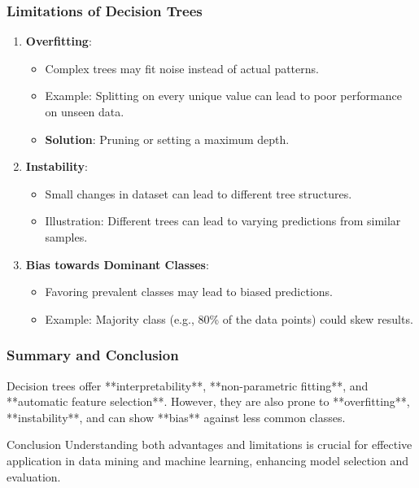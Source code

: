 \documentclass[aspectratio=169]{beamer}
\begin{document}
\begin{frame}[fragile]
    \frametitle{Limitations of Decision Trees}
    \begin{enumerate}
        \item \textbf{Overfitting}:
            \begin{itemize}
                \item Complex trees may fit noise instead of actual patterns.
                \item Example: Splitting on every unique value can lead to poor performance on unseen data.
                \item \textbf{Solution}: Pruning or setting a maximum depth.
            \end{itemize}
        
        \item \textbf{Instability}:
            \begin{itemize}
                \item Small changes in dataset can lead to different tree structures.
                \item Illustration: Different trees can lead to varying predictions from similar samples.
            \end{itemize}
        
        \item \textbf{Bias towards Dominant Classes}:
            \begin{itemize}
                \item Favoring prevalent classes may lead to biased predictions.
                \item Example: Majority class (e.g., 80\% of the data points) could skew results.
            \end{itemize}
    \end{enumerate}
\end{frame}

\begin{frame}[fragile]
    \frametitle{Summary and Conclusion}
    Decision trees offer **interpretability**, **non-parametric fitting**, and **automatic feature selection**. However, they are also prone to **overfitting**, **instability**, and can show **bias** against less common classes.

    \begin{block}{Conclusion}
        Understanding both advantages and limitations is crucial for effective application in data mining and machine learning, enhancing model selection and evaluation.
    \end{block}
\end{frame}
\end{document}
